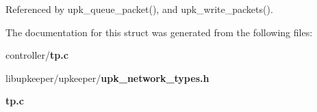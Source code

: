 Referenced by upk\_\-queue\_\-packet(), and upk\_\-write\_\-packets().



The documentation for this struct was generated from the following files:\begin{DoxyCompactItemize}
\item 
controller/{\bf tp.c}\item 
libupkeeper/upkeeper/{\bf upk\_\-network\_\-types.h}\item 
{\bf tp.c}\end{DoxyCompactItemize}
